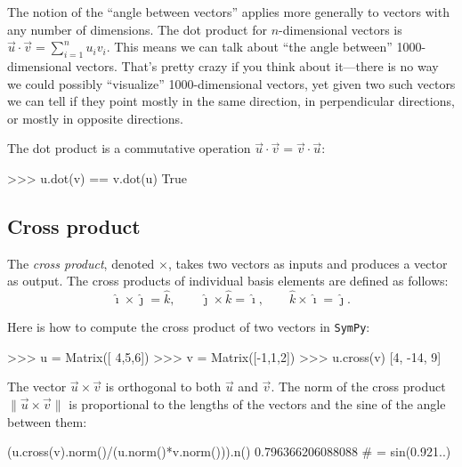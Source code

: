 The notion of the ``angle between vectors'' applies more generally to vectors with any number of dimensions.
The dot product for $n$-dimensional vectors is $\vec{u}\cdot\vec{v}=\sum_{i=1}^n u_iv_i$.
This means we can talk about ``the angle between'' 1000-dimensional vectors.
That's pretty crazy if you think about it---there is no way we could possibly ``visualize'' 1000-dimensional vectors,
yet given two such vectors we can tell if they point mostly in the same direction,
in perpendicular directions, or mostly in opposite directions. 

The dot product is a commutative operation $\vec{u}\cdot\vec{v} = \vec{v}\cdot\vec{u}$:



\small
\begin{verbatimtab}
>>> u.dot(v) == v.dot(u)
True
\end{verbatimtab}
\normalsize





\subsection{Cross product}
\label{vectors:cross_product}

The \emph{cross product}, denoted $\times$,															
takes two vectors as inputs and produces a vector as output.
The cross products of individual basis elements are defined as follows:
\[
 \hat{\imath}\times\hat{\jmath} =\hat{k}, \qquad
 \hat{\jmath}\times\hat{k} =\hat{\imath}, \qquad
 \hat{k}\times \hat{\imath}= \hat{\jmath}.
\]

\noindent
Here is how to compute the cross product of two vectors in \texttt{SymPy}:
\small
\begin{verbatimtab}
>>> u = Matrix([ 4,5,6])
>>> v = Matrix([-1,1,2])
>>> u.cross(v)
[4, -14, 9]
\end{verbatimtab}
\normalsize

\noindent
The vector $\vec{u}\times \vec{v}$ is orthogonal to both $\vec{u}$ and $\vec{v}$.
The norm of the cross product  $\|\vec{u}\times \vec{v}\|$ is proportional to the lengths of the vectors
and the sine of the angle between them:
\small
\begin{verbatimtab}
(u.cross(v).norm()/(u.norm()*v.norm())).n()
0.796366206088088    # = sin(0.921..) 
\end{verbatimtab}
\normalsize


